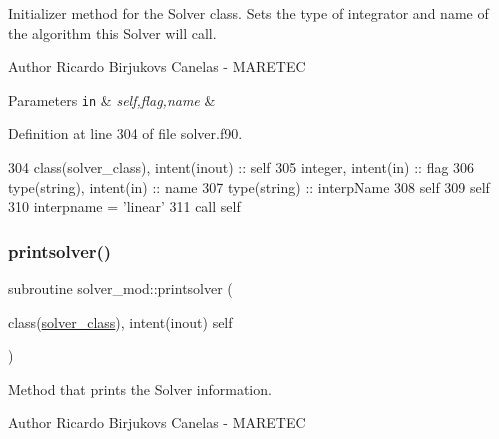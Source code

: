 Initializer method for the Solver class. Sets the type of integrator and name of the algorithm this Solver will call. 

\begin{DoxyAuthor}{Author}
Ricardo Birjukovs Canelas -\/ M\+A\+R\+E\+T\+EC 
\end{DoxyAuthor}

\begin{DoxyParams}[1]{Parameters}
\mbox{\tt in}  & {\em self,flag,name} & \\
\hline
\end{DoxyParams}


Definition at line 304 of file solver.\+f90.


\begin{DoxyCode}
304     \textcolor{keywordtype}{class}(solver\_class), \textcolor{keywordtype}{intent(inout)} :: self
305     \textcolor{keywordtype}{integer}, \textcolor{keywordtype}{intent(in)} :: flag
306     \textcolor{keywordtype}{type}(string), \textcolor{keywordtype}{intent(in)} :: name
307     \textcolor{keywordtype}{type}(string) :: interpName
308     self%
309     self%
310     interpname = \textcolor{stringliteral}{'linear'}
311     \textcolor{keyword}{call }self%
\end{DoxyCode}
\mbox{\label{namespacesolver__mod_a54ea6899cce026a7a5da2dd05922628f}} 
\subsubsection{\texorpdfstring{printsolver()}{printsolver()}}
{\footnotesize\ttfamily subroutine solver\+\_\+mod\+::printsolver (\begin{DoxyParamCaption}\item[{class(\mbox{\hyperlink{structsolver__mod_1_1solver__class}{solver\+\_\+class}}), intent(inout)}]{self }\end{DoxyParamCaption})\hspace{0.3cm}{\ttfamily [private]}}



Method that prints the Solver information. 

\begin{DoxyAuthor}{Author}
Ricardo Birjukovs Canelas -\/ M\+A\+R\+E\+T\+EC 
\end{DoxyAuthor}



